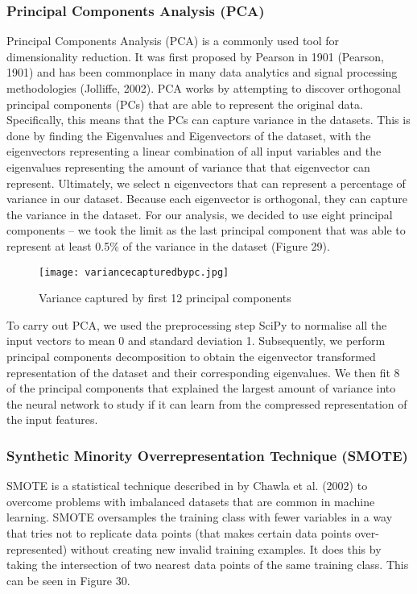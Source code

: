\documentclass{article}
\begin{document}
\subsubsection{Principal Components Analysis (PCA)}
Principal Components Analysis (PCA) is a commonly used tool for dimensionality reduction. It was first proposed by Pearson in 1901 (Pearson, 1901) and has been commonplace in many data analytics and signal processing methodologies (Jolliffe, 2002). PCA works by attempting to discover orthogonal principal components (PCs) that are able to represent the original data. Specifically, this means that the PCs can capture variance in the datasets. This is done by finding the Eigenvalues and Eigenvectors of the dataset, with the eigenvectors representing a linear combination of all input variables and the eigenvalues representing the amount of variance that that eigenvector can represent. Ultimately, we select n eigenvectors that can represent a percentage of variance in our dataset. Because each eigenvector is orthogonal, they can capture the variance in the dataset. For our analysis, we decided to use eight principal components -- we took the limit as the last principal component that was able to represent at least 0.5\% of the variance in the dataset (Figure 29).
 
\begin{figure}[H]
\texttt{[image: variancecapturedbypc.jpg]}
\caption{Variance captured by first 12 principal components}
\centering
\end{figure}

To carry out PCA, we used the preprocessing step SciPy to normalise all the input vectors to mean 0 and standard deviation 1. Subsequently, we perform principal components decomposition to obtain the eigenvector transformed representation of the dataset and their corresponding eigenvalues. We then fit 8 of the principal components that explained the largest amount of variance into the neural network to study if it can learn from the compressed representation of the input features. 
\subsubsection{Synthetic Minority Overrepresentation Technique (SMOTE)}
SMOTE is a statistical technique described in by Chawla et al. (2002) to overcome problems with imbalanced datasets that are common in machine learning. SMOTE oversamples the training class with fewer variables in a way that tries not to replicate data points (that makes certain data points over-represented) without creating new invalid training examples. It does this by taking the intersection of two nearest data points of the same training class. This can be seen in Figure 30. 
\end{document}
